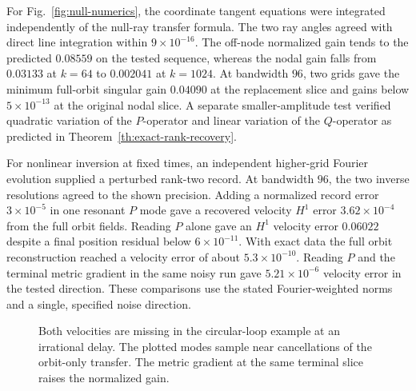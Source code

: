 For Fig.~\ref{fig:null-numerics}, the coordinate tangent
equations were integrated independently of the null-ray
transfer formula. The two ray angles agreed with
direct line integration within $9\times10^{-16}$.
The off-node normalized gain tends to the predicted
$0.08559$ on the tested sequence, whereas the nodal
gain falls from $0.03133$ at $k=64$ to $0.002041$
at $k=1024$. At bandwidth $96$, two grids gave the
minimum full-orbit singular gain $0.04090$ at the
replacement slice and gains below $5\times10^{-13}$
at the original nodal slice. A separate smaller-amplitude
test verified quadratic variation of the $P$-operator
and linear variation of the $Q$-operator as predicted
in Theorem~\ref{th:exact-rank-recovery}.

For nonlinear inversion at fixed times, an independent
higher-grid Fourier evolution supplied a perturbed
rank-two record. At bandwidth $96$, the two inverse
resolutions agreed to the shown precision.
Adding a normalized record error $3\times10^{-5}$ in
one resonant $P$ mode gave a recovered velocity
$H^1$ error $3.62\times10^{-4}$ from the full orbit
fields. Reading $P$ alone gave an $H^1$ velocity
error $0.06022$ despite a final position residual
below $6\times10^{-11}$. With exact data the full
orbit reconstruction reached a velocity error of
about $5.3\times10^{-10}$.
Reading $P$ and the terminal metric gradient in the
same noisy run gave $5.21\times10^{-6}$ velocity
error in the tested direction. These comparisons use
the stated Fourier-weighted norms and a single, specified
noise direction.

\begin{figure}[htbp]
\centering
{}
\caption{Both velocities are missing in the circular-loop
example at an irrational delay. The plotted modes sample
near cancellations of the orbit-only transfer.
The metric gradient at the same terminal slice
raises the normalized gain.}
\label{fig:irrational-metric}
\end{figure}

